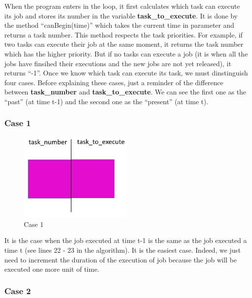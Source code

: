 \documentclass[a4paper,12pt]{article}
\begin{document}
\smallskip
\noindent
When the program enters in the loop, it first calculates which task can execute its job and stores its number in the variable \textbf{task\_to\_execute}. It is done by the method ``canBegin(time)'' which takes the current time in parameter and returns a task number. This method respects the task priorities. For example, if two tasks can execute their job at the same moment, it returns the task number which has the higher priority. But if no tasks can execute a job (it is when all the jobs have finsihed their executions and the new jobs are not yet released), it returns ``-1''. Once we know which task can execute its task, we must dinstinguish four cases. Before explaining these cases, just a reminder of the difference between \textbf{task\_number} and \textbf{task\_to\_execute}. We can see the first one as the ``past'' (at time t-1) and the second one as the ``present'' (at time t).

\subsubsection{Case 1}

\begin{figure}[h!]
  \centering
  \includegraphics[width=0.5\textwidth]{Resources_tex/Pictures/Case1.jpg}
  \caption{Case 1}
  \label{fig: Case 1}
\end{figure}

\smallskip
\noindent
It is the case when the job executed at time t-1 is the same as the job executed a time t (see lines 22 - 23 in the algorithm). It is the easiest case. Indeed, we just need to increment the duration of the execution of job because the job will be executed one more unit of time. 


\newpage

\subsubsection{Case 2}
\end{document}

